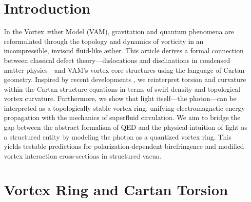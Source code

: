 \section{Introduction}
    In the Vortex \ae ther Model (VAM), gravitation and quantum phenomena are reformulated through the topology and dynamics of vorticity in an incompressible, inviscid fluid-like \ae ther. This article derives a formal connection between classical defect theory---dislocations and disclinations in condensed matter physics---and VAM's vortex core structures using the language of Cartan geometry. Inspired by recent developments \cite{kobayashi2025}, we reinterpret torsion and curvature within the Cartan structure equations in terms of swirl density and topological vortex curvature. Furthermore, we show that light itself---the photon---can be interpreted as a topologically stable vortex ring, unifying electromagnetic energy propagation with the mechanics of superfluid circulation.
    We aim to bridge the gap between the abstract formalism of QED and the physical intuition of light as a structured entity by modeling the photon as a quantized vortex ring. This yields testable predictions for polarization-dependent birefringence and modified vortex interaction cross-sections in structured vacua.


\section{Vortex Ring and Cartan Torsion}

\begin{center}
\end{center}


